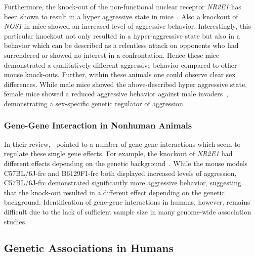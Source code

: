 Furthermore, the knock-out of the non-functional nuclear receptor \textit{NR2E1} has been shown to result in a hyper aggressive state in mice~\cite{Young2002}.
Also a knockout of \textit{NOS1} in mice showed an increased level of aggressive behavior.
Interestingly, this particular knockout not only resulted in a hyper-aggressive state but also in a behavior which can be described as a relentless attack on opponents who had surrendered or showed no interest in a confrontation.
Hence these mice demonstrated a qualitatively different aggressive behavior compared to other mouse knock-outs.
Further, within these animals one could observe clear sex differences.
While male mice showed the above-described hyper aggressive state, female mice showed a reduced aggressive behavior against male invaders~\cite{Gammie1999,Nelson1995}, demonstrating a sex-specific genetic regulator of aggression.

\subsubsection{Gene-Gene Interaction in Nonhuman Animals}
\label{ssub:Gene-Gene_Interaction_in_nonhuman_animals}

In their review,~\citet{Anholt2012} pointed to a number of gene-gene interactions which seem to regulate these single gene effects.
For example, the knockout of \textit{NR2E1} had different effects depending on the genetic background~\cite{Young2002}.
While the mouse models C57BL/6J-frc and B6129F1-frc both displayed increased levels of aggression, C57BL/6J-frc demonstrated significantly more aggressive behavior,
 suggesting that the knock-out resulted in a different effect depending on the genetic background.
Identification of gene-gene interactions in humans, however, remains difficult due to the lack of sufficient sample size in many genome-wide association studies.

\subsection{Genetic Associations in Humans}
\label{sub:genetic_associations_in_humans}

